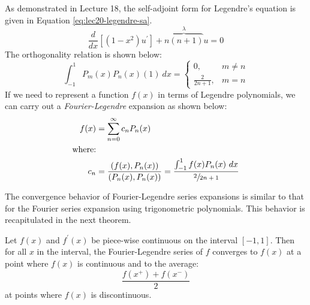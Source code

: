As demonstrated in Lecture 18, the self-adjoint form for Legendre's equation is given in Equation \ref{eq:lec20-legendre-sa}.
\begin{equation}
\frac{d}{dx}\left[\left(1-x^2 \right) u^{\prime} \right] + \overbrace{n(n+1)}^{\lambda}u = 0
\label{eq:lec20-legendre-sa}
\end{equation}
The orthogonality relation is shown below:
\begin{equation*}
\int_{-1}^{1} P_m(x)P_n(x) (1) \ dx = 
\begin{cases}
0, & m\ne n \\
\frac{2}{2n+1}, & m=n
\end{cases}
\end{equation*}
If we need to represent a function $f(x)$ in terms of Legendre polynomials, we can carry out a \emph{Fourier-Legendre} expansion as shown below:
\begin{align}
f(x) &= \sum\limits_{n=0}^{\infty}c_n P_n(x) \label{eq:lec20-FL-exp}\\ 
\text{where:}& \nonumber \\
c_n &= \frac{\left(f(x),P_n(x) \right)}{\left(P_n(x),P_n(x) \right)} = \frac{\int_{-1}^{1} f(x) P_n(x) \ dx}{\sfrac{2}{2n+1}} 
\label{eq:lec20-FL-coeff}
\end{align}

The convergence behavior of Fourier-Legendre series expansions is similar to that for the Fourier series expansion using trigonometric polynomials.  This behavior is recapitulated in the next theorem. 

\begin{theorem}
Let $f(x)$ and $f^{\prime}(x)$ be piece-wise continuous on the interval $[-1,1]$. Then for all $x$ in the interval, the Fourier-Legendre series of $f$ converges to $f(x)$ at a point where $f(x)$ is continuous and to the average:
\begin{equation*}
\frac{f(x^+) + f(x^-) }{2}
\end{equation*}
at points where $f(x)$ is discontinuous.
\end{theorem}

